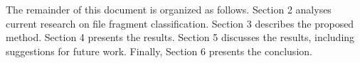 
The remainder of this document is organized as follows.
    Section 2 analyses current research on file fragment classification. 
    Section 3 describes the proposed method.
    Section 4 presents the results.
    Section 5 discusses the results, including suggestions for future work.
    Finally, Section 6 presents the conclusion.
